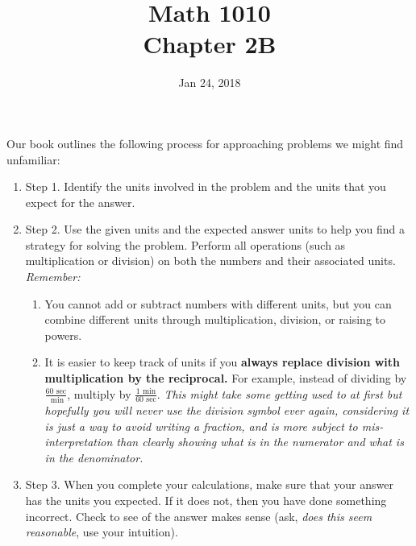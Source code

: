\documentclass[12pt]{article}
\begin{document}
\title{\bf Math 1010 \\ Chapter 2B}
\date{Jan 24, 2018}
\maketitle








Our book outlines the following process for approaching problems we might find unfamiliar: \\
\begin{enumerate}

\item Step 1. Identify the units involved in the problem and the units that you expect for the answer.

\item Step 2. Use the given units and the expected answer units to help you find a strategy for solving the problem.
Perform all operations (such as multiplication or division) on both the numbers and their associated units.  \emph{Remember:}
\begin{enumerate}
\item You cannot add or subtract numbers with different units, but you can combine different units through multiplication, division, or raising to powers.
\item It is easier to keep track of units if you \textbf{always replace division with multiplication by the reciprocal.} 
For example, instead of dividing by  $\frac{60\text{ sec}}{\text{ min}}$, multiply by $\frac{1\text{ min}}{60\text{ sec}}$. 
\emph{This might take some getting used to at first but hopefully you will never use the division symbol ever again, considering it is just a way to avoid writing a fraction, and is more subject to mis-interpretation than clearly showing what is in the numerator and what is in the denominator.}
\end{enumerate}

\item Step 3. When you complete your calculations, make sure that your answer has the units you expected.  If it does not, then you have done something incorrect.  Check to see of the answer makes sense (ask, \emph{does this seem reasonable}, use your intuition).
\end{enumerate}
\vspace{2in}
\end{document}
